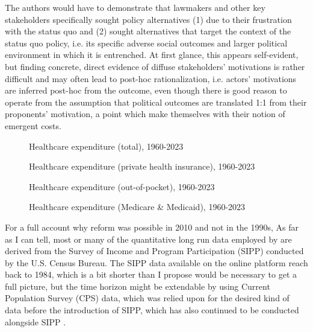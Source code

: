 \documentclass[11pt]{article}
\begin{document}
The authors would have to demonstrate that lawmakers and other key stakeholders specifically sought policy alternatives (1) due to their frustration with the status quo and (2) sought alternatives that target the context of the status quo policy, i.e. its specific adverse social outcomes and larger political environment in which it is entrenched. At first glance, this appears self-evident, but finding concrete, direct evidence of diffuse stakeholders' motivations is rather difficult and may often lead to post-hoc rationalization, i.e.  actors' motivations are inferred post-hoc from the outcome, even though there is good reason to operate from the assumption that political outcomes are translated 1:1 from their proponents' motivation, a point which \textcite[][]{Jacobs2014} make themselves with their notion of emergent costs.

\begin{figure}[H]
  \sffamily
  \caption{Healthcare expenditure (total), 1960-2023}
  
  \label{fig:expend_total}
\end{figure}

\begin{figure}[H]
  \sffamily
  \caption{Healthcare expenditure (private health insurance), 1960-2023}
  
  \label{fig:expend_priv}
\end{figure}

\begin{figure}[H]
  \sffamily
  \caption{Healthcare expenditure (out-of-pocket), 1960-2023}
  
  \label{fig:expend_priv}
\end{figure}

\begin{figure}[H]
  \sffamily
  \caption{Healthcare expenditure (Medicare \& Medicaid), 1960-2023}
  
  \label{fig:expend_pub}
\end{figure}

For a full account why reform was possible in 2010 and not in the 1990s, As far as I can tell, most or many of the quantitative long run data employed by \textcite[][]{Jacobs2014} are derived from the Survey of Income and Program Participation (SIPP) conducted by the U.S. Census Bureau. The SIPP data available on the online platform reach back to 1984, which is a bit shorter than I propose would be necessary to get a full picture, but the time horizon might be extendable by using Current Population Survey (CPS) data, which was relied upon for the desired kind of data before the introduction of SIPP, which has also continued to be conducted alongside SIPP \parencite[][]{Census2022}.
\end{document}
